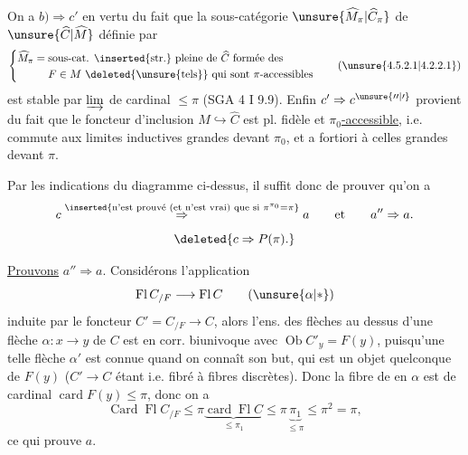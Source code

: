 On a $b)\Rightarrow c'$ en vertu du fait que la sous-catégorie  $\unsure{\widehat M_\pi|\widehat C_\pi}$ de $\unsure{\widehat C|\widehat M}$ définie par
\[
\left\{\begin{aligned}
\widehat M_\pi={}&\text{sous-cat. \inserted{str.} pleine de }\widehat C\text{ formée des}\\
&F\in M\ \deleted{\text{\unsure{tels}}}\text{ qui sont }\pi\text{-accessibles}
\end{aligned}\right.\tag*{(\unsure{4.5.2.1|4.2.2.1})}
\]
est stable par $\varinjlim$ de cardinal $\leq\pi$ (SGA 4 I 9.9). Enfin $c'\Rightarrow c^{\unsure{\prime\prime|\prime}}$ provient du fait que le  foncteur d'inclusion $M\hookrightarrow\widehat C$ est pl. fidèle et \uline{$\pi_0$-accessible}, i.e. commute aux limites inductives grandes devant $\pi_0$, et a fortiori à celles grandes devant $\pi$.

  Par les indications du diagramme ci-dessus, il suffit donc de prouver qu'on a
\[
c\overset{\inserted{\text{n'est prouvé (et n'est vrai) que si }\pi^{\pi_0}=\pi}}{\Rightarrow} a
\qquad\text{et}\qquad a''\Rightarrow a.
\]
\[
\deleted{c\Rightarrow P(\pi).}
\]

\uline{Prouvons} $a''\Rightarrow a$. Considérons l'application
\[
\operatorname{Fl} C_{/F}\longrightarrow\operatorname{Fl} C\tag*{(\unsure{\(\alpha\)|\(\ast\)})}
\]
induite par le foncteur  $C'=C_{/F}\longrightarrow C$, alors l'ens. des flèches au dessus d'une flèche $\alpha:x\longrightarrow y$ de $C$ est  en corr. biunivoque avec $\operatorname{Ob} C'_y=F(y)$, puisqu'une telle flèche $\alpha'$ est connue quand on connaît son but, qui est un objet quelconque de $F(y)$ ($C'\longrightarrow C$ étant  i.e. fibré à fibres discrètes). Donc la fibre de \unsure{(\(\alpha\))|(\(\ast\))} en $\alpha$ est  de cardinal \deleted{$\leq$} $\operatorname{card} F(y)\leq\pi$, donc on a
\[
\operatorname{Card}\operatorname{Fl} C_{/F}\leq\pi\underbrace{\operatorname{card}\operatorname{Fl} C}_{\leq\pi_1}
\leq\pi\underbrace{\pi_1}_{\leq\pi}\leq\pi^2=\pi,
\]
ce qui prouve $a$.

